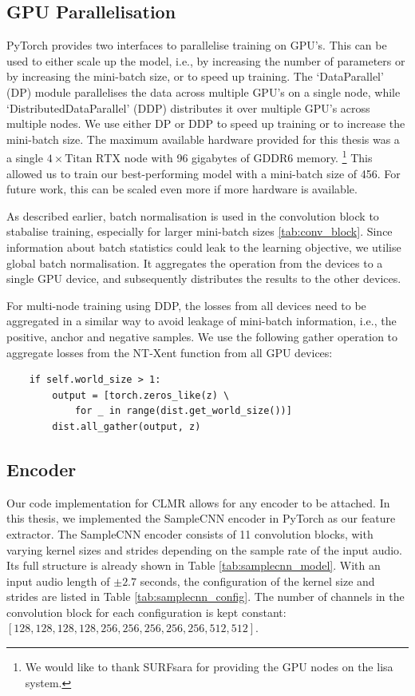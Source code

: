 \subsection{GPU Parallelisation}
PyTorch provides two interfaces to parallelise training on GPU's.
This can be used to either scale up the model, i.e., by increasing the number of parameters or by increasing the mini-batch size, or to speed up training.
The `DataParallel' (DP) module parallelises the data across multiple GPU's on a single node, while `DistributedDataParallel' (DDP) distributes it over multiple GPU's across multiple nodes.
We use either DP or DDP to speed up training or to increase the mini-batch size.
The maximum available hardware provided for this thesis was a a single $4\times \text{Titan RTX}$ node with 96 gigabytes of GDDR6 memory.
\footnote{We would like to thank SURFsara for providing the GPU nodes on the lisa system.}
This allowed us to train our best-performing model with a mini-batch size of 456. For future work, this can be scaled even more if more hardware is available.

As described earlier, batch normalisation is used in the convolution block to stabalise training, especially for larger mini-batch sizes \ref{tab:conv_block}.
Since information about batch statistics could leak to the learning objective, we utilise global batch normalisation.
It aggregates the operation from the devices to a single GPU device, and subsequently distributes the results to the other devices.

For multi-node training using DDP, the losses from all devices need to be aggregated in a similar way to avoid leakage of mini-batch information, i.e., the positive, anchor and negative samples. We use the following gather operation to aggregate losses from the NT-Xent function from all GPU devices:

\begin{verbatim}
    if self.world_size > 1:
        output = [torch.zeros_like(z) \
            for _ in range(dist.get_world_size())]
        dist.all_gather(output, z)
\end{verbatim}

\subsection{Encoder}
Our code implementation for CLMR allows for any encoder to be attached.
In this thesis, we implemented the SampleCNN encoder in PyTorch as our feature extractor.
The SampleCNN encoder consists of 11 convolution blocks, with varying kernel sizes and strides depending on the sample rate of the input audio. Its full structure is already shown in Table \ref{tab:samplecnn_model}.
With an input audio length of $±2.7$ seconds, the configuration of the kernel size and strides are listed in Table \ref{tab:samplecnn_config}.
The number of channels in the convolution block for each configuration is kept constant: $[128, 128, 128, 128, 256, 256, 256 , 256, 256, 512, 512]$.

